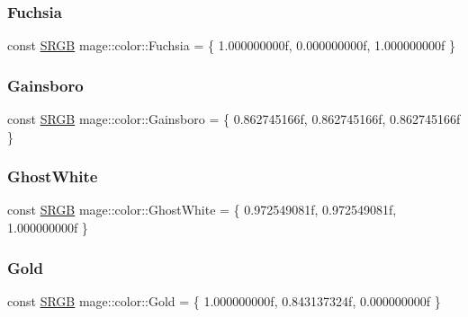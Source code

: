 \subsubsection{\texorpdfstring{Fuchsia}{Fuchsia}}
{\footnotesize\ttfamily const \hyperlink{structmage_1_1_s_r_g_b}{S\+R\+GB} mage\+::color\+::\+Fuchsia = \{ 1.\+000000000f, 0.\+000000000f, 1.\+000000000f \}}

\hypertarget{namespacemage_1_1color_a8c04c8f95fa039376ed9427ed66a44bc}{}\label{namespacemage_1_1color_a8c04c8f95fa039376ed9427ed66a44bc} 
\subsubsection{\texorpdfstring{Gainsboro}{Gainsboro}}
{\footnotesize\ttfamily const \hyperlink{structmage_1_1_s_r_g_b}{S\+R\+GB} mage\+::color\+::\+Gainsboro = \{ 0.\+862745166f, 0.\+862745166f, 0.\+862745166f \}}

\hypertarget{namespacemage_1_1color_a8bfaff6141aba03ebc2e66108b268b7a}{}\label{namespacemage_1_1color_a8bfaff6141aba03ebc2e66108b268b7a} 
\subsubsection{\texorpdfstring{Ghost\+White}{GhostWhite}}
{\footnotesize\ttfamily const \hyperlink{structmage_1_1_s_r_g_b}{S\+R\+GB} mage\+::color\+::\+Ghost\+White = \{ 0.\+972549081f, 0.\+972549081f, 1.\+000000000f \}}

\hypertarget{namespacemage_1_1color_a6eafe437aa82470f52c8e8827c9df7ce}{}\label{namespacemage_1_1color_a6eafe437aa82470f52c8e8827c9df7ce} 
\subsubsection{\texorpdfstring{Gold}{Gold}}
{\footnotesize\ttfamily const \hyperlink{structmage_1_1_s_r_g_b}{S\+R\+GB} mage\+::color\+::\+Gold = \{ 1.\+000000000f, 0.\+843137324f, 0.\+000000000f \}}

\hypertarget{namespacemage_1_1color_a833b431e0f7d36811a237fc3c9b681a7}{}\label{namespacemage_1_1color_a833b431e0f7d36811a237fc3c9b681a7} 
